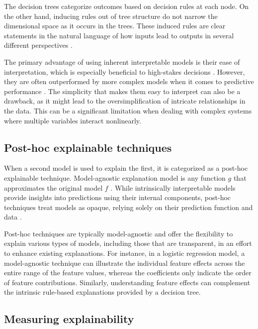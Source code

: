 The decision trees categorize outcomes based on decision rules at each node. On the other hand, inducing rules out of tree structure do not narrow the dimensional space as it occurs in the trees. These induced rules are clear statements in the natural language of how inputs lead to outputs in several different perspectives \cite{SilvaFilho2019DataInstitutes}.

The primary advantage of using inherent interpretable models is their ease of interpretation, which is especially beneficial to high-stakes decisions \cite{Rudin2019StopInstead}. However, they are often outperformed by more complex models when it comes to predictive performance \cite{Loyola-Gonzalez2019Black-boxView}. The simplicity that makes them easy to interpret can also be a drawback, as it might lead to the oversimplification of intricate relationships in the data. This can be a significant limitation when dealing with complex systems where multiple variables interact nonlinearly.

\subsection{Post-hoc explainable techniques}

When a second model is used to explain the first, it is categorized as a post-hoc explainable technique. Model-agnostic explanation model is any function \(g\) that approximates the original model \(f\) \cite{10.5555/3295222.3295230}. While intrinsically interpretable models provide insights into predictions using their internal components, post-hoc techniques treat models as opaque, relying solely on their prediction function and data \cite{Molnar2022Model-agnosticLearning}. 

Post-hoc techniques are typically model-agnostic and offer the flexibility to explain various types of models, including those that are transparent, in an effort to enhance existing explanations. For instance, in a logistic regression model, a model-agnostic technique can illustrate the individual feature effects across the entire range of the feature values, whereas the coefficients only indicate the order of feature contributions. Similarly, understanding feature effects can complement the intrinsic rule-based explanations provided by a decision tree. 

\subsection{Measuring explainability}

